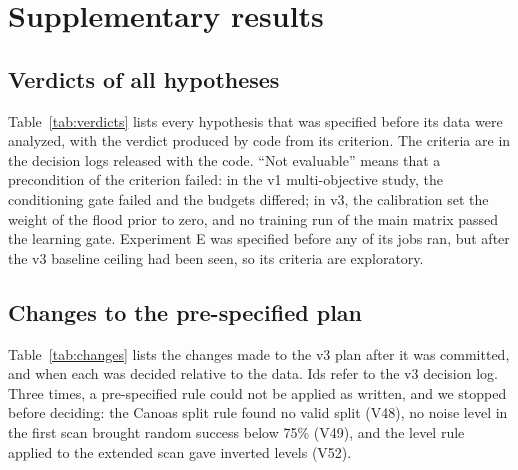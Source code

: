 \section{Supplementary results}
\label{sec:appendix}

\subsection{Verdicts of all hypotheses}
Table~\ref{tab:verdicts} lists every hypothesis that was specified before its data were analyzed, with the verdict produced by code from its criterion. The criteria are in the decision logs released with the code. ``Not evaluable'' means that a precondition of the criterion failed: in the v1 multi-objective study, the conditioning gate failed and the budgets differed; in v3, the calibration set the weight of the flood prior to zero, and no training run of the main matrix passed the learning gate. Experiment E was specified before any of its jobs ran, but after the v3 baseline ceiling had been seen, so its criteria are exploratory.

\begin{table}[h]
\centering
\caption{Verdicts of the pre-specified hypotheses and of the exploratory criteria of experiment E. v1 verdicts use the hierarchical intervals; E3 uses sampled actions (argmax: same verdict).}
\label{tab:verdicts}
\scriptsize
\setlength{\tabcolsep}{3pt}

\end{table}

\subsection{Changes to the pre-specified plan}
Table~\ref{tab:changes} lists the changes made to the v3 plan after it was committed, and when each was decided relative to the data. Ids refer to the v3 decision log. Three times, a pre-specified rule could not be applied as written, and we stopped before deciding: the Canoas split rule found no valid split (V48), no noise level in the first scan brought random success below 75\% (V49), and the level rule applied to the extended scan gave inverted levels (V52).

